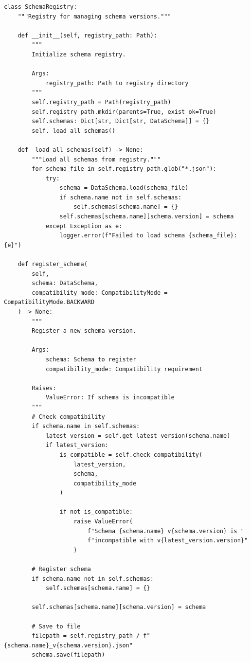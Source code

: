 \begin{lstlisting}[style=python, caption={Schema registry with versioning and compatibility}]
class SchemaRegistry:
    """Registry for managing schema versions."""

    def __init__(self, registry_path: Path):
        """
        Initialize schema registry.

        Args:
            registry_path: Path to registry directory
        """
        self.registry_path = Path(registry_path)
        self.registry_path.mkdir(parents=True, exist_ok=True)
        self.schemas: Dict[str, Dict[str, DataSchema]] = {}
        self._load_all_schemas()

    def _load_all_schemas(self) -> None:
        """Load all schemas from registry."""
        for schema_file in self.registry_path.glob("*.json"):
            try:
                schema = DataSchema.load(schema_file)
                if schema.name not in self.schemas:
                    self.schemas[schema.name] = {}
                self.schemas[schema.name][schema.version] = schema
            except Exception as e:
                logger.error(f"Failed to load schema {schema_file}: {e}")

    def register_schema(
        self,
        schema: DataSchema,
        compatibility_mode: CompatibilityMode = CompatibilityMode.BACKWARD
    ) -> None:
        """
        Register a new schema version.

        Args:
            schema: Schema to register
            compatibility_mode: Compatibility requirement

        Raises:
            ValueError: If schema is incompatible
        """
        # Check compatibility
        if schema.name in self.schemas:
            latest_version = self.get_latest_version(schema.name)
            if latest_version:
                is_compatible = self.check_compatibility(
                    latest_version,
                    schema,
                    compatibility_mode
                )

                if not is_compatible:
                    raise ValueError(
                        f"Schema {schema.name} v{schema.version} is "
                        f"incompatible with v{latest_version.version}"
                    )

        # Register schema
        if schema.name not in self.schemas:
            self.schemas[schema.name] = {}

        self.schemas[schema.name][schema.version] = schema

        # Save to file
        filepath = self.registry_path / f"{schema.name}_v{schema.version}.json"
        schema.save(filepath)


\end{lstlisting}
